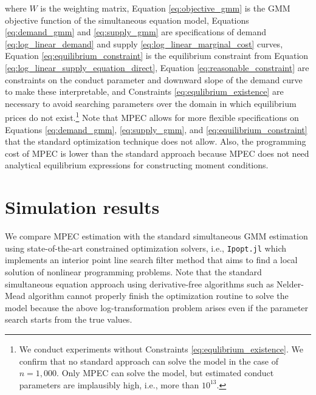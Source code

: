 \documentclass[11pt, a4paper]{article}
\begin{document}
where $W$ is the weighting matrix, Equation \eqref{eq:objective_gmm} is the GMM objective function of the simultaneous equation model, 
Equations \eqref{eq:demand_gmm} and \eqref{eq:supply_gmm} are specifications of demand \eqref{eq:log_linear_demand} and supply \eqref{eq:log_linear_marginal_cost} curves, 
Equation \eqref{eq:equilibrium_constraint} is the equilibrium constraint from Equation \eqref{eq:log_linear_supply_equation_direct}, Equation \eqref{eq:reasonable_constraint} are constraints on the conduct parameter and downward slope of the demand curve to make these interpretable, and Constraints \eqref{eq:equlibrium_existence} are necessary to avoid searching parameters over the domain in which equilibrium prices do not exist.\footnote{We conduct experiments without Constraints \eqref{eq:equlibrium_existence}. We confirm that no standard approach can solve the model in the case of $n=1,000$. Only MPEC can solve the model, but estimated conduct parameters are implausibly high, i.e., more than $10^{13}$.}
Note that MPEC allows for more flexible specifications on Equations \eqref{eq:demand_gmm}, \eqref{eq:supply_gmm}, and \eqref{eq:equilibrium_constraint} that the standard optimization technique does not allow. Also, the programming cost of MPEC is lower than the standard approach because MPEC does not need analytical equilibrium expressions for constructing moment conditions.





\section{Simulation results}\label{sec:results}

We compare MPEC estimation with the standard simultaneous GMM estimation using state-of-the-art constrained optimization solvers, i.e., \texttt{Ipopt.jl} which implements an interior point line search filter method that aims to find a local solution of nonlinear programming problems. Note that the standard simultaneous equation approach using derivative-free algorithms such as Nelder-Mead algorithm cannot properly finish the optimization routine to solve the model because the above log-transformation problem arises even if the parameter search starts from the true values.  
\end{document}
